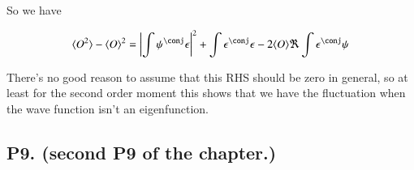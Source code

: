 \documentclass{article}
\newcommand{\expectation}[1]{\langle{#1}\rangle}
\begin{document}
So we have

\begin{align*}
\expectation{O^2} - \expectation{O}^2 
&= 
\Abs{\int \psi^\conj \epsilon}^2 + \int \epsilon^\conj \epsilon - 2 \expectation{O} \Re \int \epsilon^\conj \psi \\
\end{align*}

There's no good reason to assume that this RHS should be zero in general, so at least for the second order moment this shows that we have the fluctuation when the wave
function isn't an eigenfunction.

\subsection{ P9. (second P9 of the chapter.) }





\end{document}
